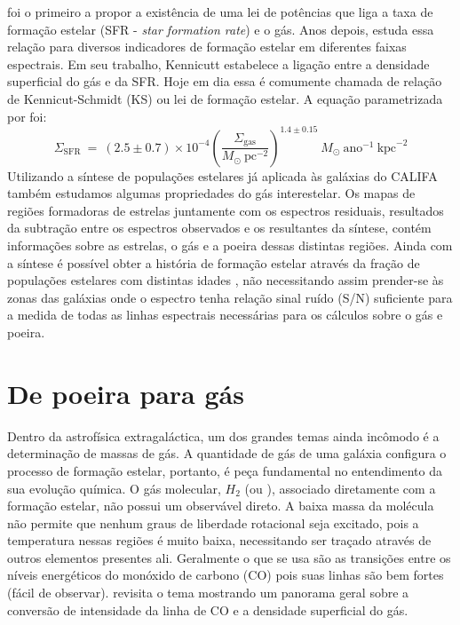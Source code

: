 \citet{Schmidt.1959a} foi o primeiro a propor a existência de uma lei de potências que liga a taxa
de formação estelar (SFR - {\em star formation rate}) e o gás. Anos depois, \citet{Kennicutt.1998a}
estuda essa relação para diversos indicadores de formação estelar em diferentes faixas espectrais.
Em seu trabalho, Kennicutt estabelece a ligação entre a densidade superficial do gás e da SFR. Hoje
em dia essa é comumente chamada de relação de Kennicut-Schmidt (KS) ou lei de formação estelar. A
equação parametrizada por \citeauthor{Kennicutt.1998a} foi:
\begin{equation}
	\Sigma_{\mathrm{SFR}}\ =\ (2.5\pm0.7)\times 10^{-4} \left(\frac{\Sigma_{\mathrm{gas}}}{
M_\odot\ \mathrm{pc}^{-2}}\right)^{1.4 \pm 0.15}\ M_\odot\ \mathrm{ano}^{-1}\ \mathrm{kpc}^{-2}
\end{equation}
\noindent Utilizando a síntese de populações estelares já aplicada às galáxias do CALIFA também
estudamos algumas propriedades do gás interestelar. Os mapas de regiões formadoras de estrelas
juntamente com os espectros residuais, resultados da subtração entre os espectros observados e os
resultantes da síntese, contém informações sobre as estrelas, o gás e a poeira dessas distintas
regiões. Ainda com a síntese é possível obter a história de formação estelar através da fração de
populações estelares com distintas idades \citep{Asari.etal.2007a}, não necessitando assim
prender-se às zonas das galáxias onde o espectro tenha relação sinal ruído (S/N) suficiente para a
medida de todas as linhas espectrais necessárias para os cálculos sobre o gás e poeira.

\section{De poeira para gás}
\label{sec:intro:dust2gas}

Dentro da astrofísica extragaláctica, um dos grandes temas ainda incômodo é a determinação de
massas de gás. A quantidade de gás de uma galáxia configura o processo de formação estelar,
portanto, é peça fundamental no entendimento da sua evolução química. O gás molecular, $H_2$ (ou
\Hii), associado diretamente com a formação estelar, não possui um observável direto. A baixa massa
da molécula \Hii não permite que nenhum graus de liberdade rotacional seja excitado, pois a
temperatura nessas regiões é muito baixa, necessitando ser traçado através de outros elementos
presentes ali. Geralmente o que se usa são as transições entre os níveis energéticos do monóxido de
carbono (CO) pois suas linhas são bem fortes (fácil de observar). \citep{Bollato.etal.2013a}
revisita o tema mostrando um panorama geral sobre a conversão de intensidade da linha de CO e a
densidade superficial do gás.

